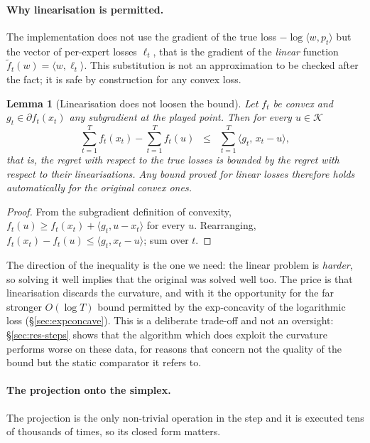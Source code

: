\documentclass[12pt,a4paper,oneside]{report}
\renewcommand{\_}{\oldunderscore\allowbreak}
\theoremstyle{definition}
\theoremstyle{plain}
\newtheorem{lemma}[theorem]{Lemma}
\theoremstyle{remark}
\begin{document}
\paragraph{Why linearisation is permitted.} The implementation does not use the gradient of
the true loss $-\log\langle w, p_t\rangle$ but the vector of per-expert losses $\ell_t$, that
is the gradient of the \emph{linear} function $\tilde{f}_t(w) = \langle w, \ell_t\rangle$. This
substitution is not an approximation to be checked after the fact; it is safe by construction
for any convex loss.

\begin{lemma}[Linearisation does not loosen the bound]
\label{lem:linearization}
Let $f_t$ be convex and $g_t \in \partial f_t(x_t)$ any subgradient at the played point. Then
for every $u \in \mathcal{K}$
\[
\sum_{t=1}^{T} f_t(x_t) - \sum_{t=1}^{T} f_t(u) \;\;\leq\;\; \sum_{t=1}^{T} \langle g_t,\, x_t - u\rangle,
\]
that is, the regret with respect to the true losses is bounded by the regret with respect to
their linearisations. Any bound proved for linear losses therefore holds automatically for the
original convex ones.
\end{lemma}

\begin{proof}
From the subgradient definition of convexity, $f_t(u) \geq f_t(x_t) + \langle g_t, u-x_t
\rangle$ for every $u$. Rearranging, $f_t(x_t) - f_t(u) \leq \langle g_t, x_t-u\rangle$; sum
over $t$.
\end{proof}

The direction of the inequality is the one we need: the linear problem is \emph{harder}, so
solving it well implies that the original was solved well too. The price is that linearisation
discards the curvature, and with it the opportunity for the far stronger $O(\log T)$ bound
permitted by the exp-concavity of the logarithmic loss (\S\ref{sec:expconcave}). This is a
deliberate trade-off and not an oversight: \S\ref{sec:res-steps} shows that the algorithm which
does exploit the curvature performs worse on these data, for reasons that concern not the
quality of the bound but the static comparator it refers to.

\paragraph{The projection onto the simplex.} The projection is the only non-trivial operation
in the step and it is executed tens of thousands of times, so its closed form matters.
\end{document}
